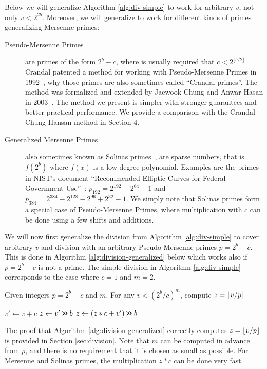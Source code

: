 Below we will generalize Algorithm \ref{alg:div-simple} to work for
arbitrary $v$, not only $v<2^{2b}$. Moreover, we will generalize
to work for different kinds of primes generalizing Mersenne primes:
\begin{description}
	\item[Pseudo-Mersenne Primes]
	      are primes of the form $2^b-c$, where is usually required that $c < 2^{\lfloor b/2\rfloor}$~\cite{van2014encyclopedia}.
	      Crandal patented a method for working with Pseudo-Mersenne Primes in 1992~\cite{crandall1992method},
	      why those primes are also sometimes called ``Crandal-primes''.
	      The method was formalized and extended by Jaewook Chung and Anwar Hasan in 2003~\cite{chung2003more}. The method we present is simpler with
	      stronger guarantees and better practical performance.
	      We provide a comparison with the Crandal-Chung-Hansan method in Section 4.
	\item[Generalized Mersenne Primes]
	      also sometimes known as Solinas primes~\cite{Solinas2011}, are sparse numbers, that is $f(2^b)$ where $f(x)$ is a low-degree polynomial.
	      Examples are the primes in NIST's document ``Recommended Elliptic Curves for Federal Government Use''~\cite{nist}:
	      $p_{192} = 2^{192} - 2^{64} - 1$
	      and
	      $p_{384} = 2^{384}-2^{128}-2^{96}+2^{32}-1$.
	      We simply note that Solinas primes form a special case of
	      Pseudo-Mersenne Primes, where multiplication with $c$
	      can be done using a few shifts and additions.
\end{description}
We will now first generalize the division from Algorithm \ref{alg:div-simple} to cover arbitrary $v$ and division with an arbitrary Pseudo-Mersenne primes $p=2^b-c$.
This is done in Algorithm \ref{alg:division-generalized} below which
works also if $p=2^b-c$ is not a prime.  The
simple division in Algorithm \ref{alg:div-simple} corresponds to the case
where $c=1$ and $m=2$.
\begin{algorithm}[H]
	\caption{Given integers $p=2^b-c$ and $m$.
		For any $v< (2^b/c)^m$, compute $z=\lfloor {v/p} \rfloor$}
	\label{alg:division-generalized}
	\begin{algorithmic}
		\State $v' \gets v + c$
		\State $z \gets v' \mathbin{\texttt{>\!>}} b$
		\State $z \gets (z * c + v')\mathbin{\texttt{>\!>}} b$
		\EndFor
	\end{algorithmic}
\end{algorithm}
The proof that Algorithm \ref{alg:division-generalized} correctly computes
$z=\lfloor {v/p} \rfloor$ is provided in Section \ref{sec:division}.
Note that $m$ can be computed in advance from $p$, and there is no requirement that it is chosen as small as possible.
For Mersenne and Solinas primes, the multiplication $z*c$ can be done very fast.


